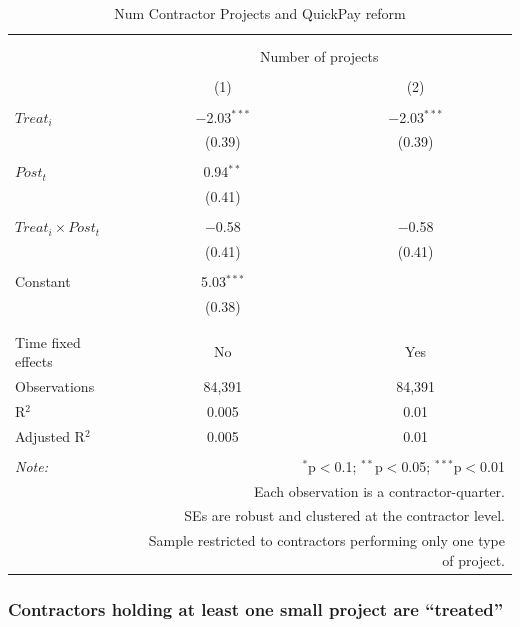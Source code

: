 \documentclass[
]{article}
\begin{document}
\begin{table}[H] \centering 
  \caption{Num Contractor Projects and QuickPay reform} 
  \label{} 
\small 
\begin{tabular}{@{\extracolsep{-2pt}}lcc} 
\\[-1.8ex]\hline 
\hline \\[-1.8ex] 
\\[-1.8ex] & \multicolumn{2}{c}{Number of projects} \\ 
\\[-1.8ex] & (1) & (2)\\ 
\hline \\[-1.8ex] 
 $Treat_i$ & $-$2.03$^{***}$ & $-$2.03$^{***}$ \\ 
  & (0.39) & (0.39) \\ 
  & & \\ 
 $Post_t$ & 0.94$^{**}$ &  \\ 
  & (0.41) &  \\ 
  & & \\ 
 $Treat_i \times Post_t$ & $-$0.58 & $-$0.58 \\ 
  & (0.41) & (0.41) \\ 
  & & \\ 
 Constant & 5.03$^{***}$ &  \\ 
  & (0.38) &  \\ 
  & & \\ 
\hline \\[-1.8ex] 
Time fixed effects & No & Yes \\ 
Observations & 84,391 & 84,391 \\ 
R$^{2}$ & 0.005 & 0.01 \\ 
Adjusted R$^{2}$ & 0.005 & 0.01 \\ 
\hline 
\hline \\[-1.8ex] 
\textit{Note:}  & \multicolumn{2}{r}{$^{*}$p$<$0.1; $^{**}$p$<$0.05; $^{***}$p$<$0.01} \\ 
 & \multicolumn{2}{r}{Each observation is a contractor-quarter.} \\ 
 & \multicolumn{2}{r}{SEs are robust and clustered at the contractor level.} \\ 
 & \multicolumn{2}{r}{Sample restricted to contractors performing only one type of project.} \\ 
\end{tabular} 
\end{table}

\hypertarget{contractors-holding-at-least-one-small-project-are-treated}{%
\subsubsection{Contractors holding at least one small project are
``treated''}\label{contractors-holding-at-least-one-small-project-are-treated}}
\end{document}
